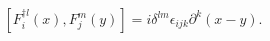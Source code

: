 \begin{equation}
\left [ F_i^{\dagger l}(x),  F_j^{ m}(y)\right ] =i \delta^{lm}\epsilon_{ijk}
\partial^k(x-y).
\end{equation}

